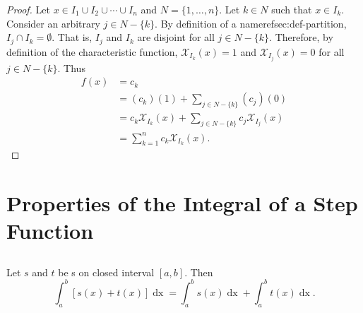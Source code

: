 \documentclass{report}
\begin{document}
\begin{proof}

  Let $x \in I_1 \cup I_2 \cup \cdots \cup I_n$ and $N = \{1, \ldots, n\}$.
  Let $k \in N$ such that $x \in I_k$.
  Consider an arbitrary $j \in N - \{k\}$.
  By definition of a nameref{sec:def-partition}, $I_j \cap I_k = \emptyset$.
  That is, $I_j$ and $I_k$ are disjoint for all $j \in N - \{k\}$.
  Therefore, by definition of the characteristic function,
    $\mathcal{X}_{I_k}(x) = 1$ and $\mathcal{X}_{I_j}(x) = 0$ for all
    $j \in N - \{k\}$.
  Thus
    \begin{align*}
      f(x)
        & = c_k \\
        & = (c_k)(1) + \sum\nolimits_{j \in N - \{k\}} (c_j)(0) \\
        & = c_k\mathcal{X}_{I_k}(x) +
          \sum\nolimits_{j \in N - \{k\}} c_j\mathcal{X}_{I_j}(x) \\
        & = \sum_{k=1}^n c_k\mathcal{X}_{I_k}(x).
    \end{align*}

\end{proof}

\chapter{Properties of the Integral of a Step Function}%
\label{chap:properties-integral-step-function}

\section{}%
\label{sec:step-additive-property}

Let $s$ and $t$ be s on closed interval $[a, b]$.
Then
  $$\int_a^b \left[ s(x) + t(x) \right] \mathop{dx} =
    \int_a^b s(x) \mathop{dx} + \int_a^b t(x) \mathop{dx}.$$
\end{document}
